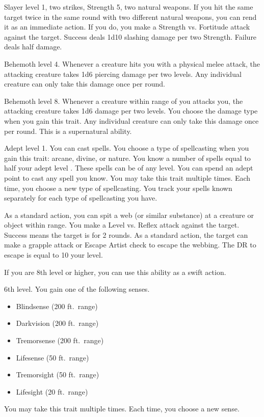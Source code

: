     \featpres Slayer level 1, two strikes, Strength 5, two natural weapons.
    \featben If you hit the same target twice in the same round with two different natural weapons, you can rend it as an immediate action.
    If you do, you make a Strength vs. Fortitude attack against the target.
    Success deals 1d10 slashing damage per two Strength.
    Failure deals half damage.

    \featpre Behemoth level 4.
    \featben Whenever a creature hits you with a physical melee attack, the attacking creature takes 1d6 piercing damage per two levels.
    Any individual creature can only take this damage once per round.

    \featpre Behemoth level 8.
    \featben Whenever a creature within \rngmed range of you attacks you, the attacking creature takes 1d6 damage per two levels.
    You choose the damage type when you gain this trait.
    Any individual creature can only take this damage once per round.
    This is a supernatural ability.

    \featpre Adept level 1.
    \featben You can cast spells.
    You choose a type of spellcasting when you gain this trait: arcane, divine, or nature.
    You know a number of spells equal to half your adept level .
    These spells can be of any level.
    You can spend an adept point to cast any spell you know.
     You may take this trait multiple times.
    Each time, you choose a new type of spellcasting.
    You track your spells known separately for each type of spellcasting you have.

    \featben As a standard action, you can spit a web (or similar substance) at a creature or object within \rngmed range.
    You make a Level vs. Reflex attack against the target.
    Success means the target is \immobilized for 2 rounds.
    As a standard action, the target can make a grapple attack or Escape Artist check to escape the webbing.
    The DR to escape is equal to 10 \add your level.

    If you are 8th level or higher, you can use this ability as a swift action.

    \featpre 6th level.
    \featben You gain one of the following senses.
    \begin{itemize}
        \item Blindsense (200 ft.\ range)
        \item Darkvision (200 ft.\ range)
        \item Tremorsense (200 ft.\ range)
        \item Lifesense (50 ft.\ range)
        \item Tremorsight (50 ft.\ range)
        \item Lifesight (20 ft.\ range)
    \end{itemize}
     You may take this trait multiple times.
    Each time, you choose a new sense.

